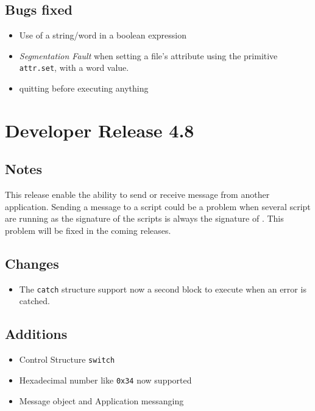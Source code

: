 \subsection{Bugs fixed}

\begin{itemize}
\item Use of a string/word in a boolean expression
\item {\it Segmentation Fault} when setting a file's attribute using the primitive {\tt attr.set}, with a word value.
\item \squirrel quitting before executing anything
\end{itemize}

\section{Developer Release 4.8}

\subsection{Notes}

This release enable the ability to send or receive message from another application. Sending a message to a \squirrel script could be a problem when several script are running as the signature of the scripts is always the signature of \squirrel. This problem will be fixed in the coming releases.

\subsection{Changes}

\begin{itemize}
\item The {\tt catch} structure support now a second block to execute when an error is catched.
\end{itemize}

\subsection{Additions}

\begin{itemize}
\item Control Structure {\tt switch}
\item Hexadecimal number like {\tt 0x34} now supported
\item Message object and Application messanging
\end{itemize}

